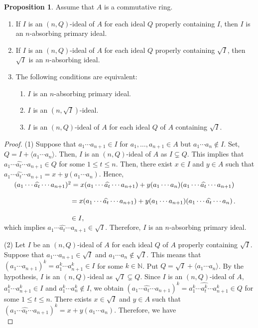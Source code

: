 \documentclass[preprint,review,10pt]{amsart}
\theoremstyle{definition}
\newtheorem{proposition}[theorem]{Proposition}
\theoremstyle{remark}
\numberwithin{equation}{section}
\begin{document}
\begin{proposition} \label{2.1}
Assume that  $A$ is a commutative ring. 
\begin{enumerate}
\item If $I$ is an  $(n,Q)$-ideal   of $A$ for each ideal $Q$   properly containing $I$, then $I$ is an $n$-absorbing primary ideal.
\item  If $I$ is an $(n,Q)$-ideal of $A$ for each ideal $Q$   properly containing $\sqrt{I}$, then $\sqrt{I}$ is an $n$-absorbing  ideal.
\item The following conditions are equivalent:
\begin{enumerate}
\item[(i)] $I$ is an  $n$-absorbing primary ideal.
\item[(ii)] $I$ is an $(n,\sqrt{I})$-ideal.
\item[(iii)] $I$ is an $(n,Q)$-ideal of $A$ for each ideal $Q$ of $A$ containing $\sqrt{I}$.
\end{enumerate}
\end{enumerate}
\begin{proof}
(1) Suppose that $a_1\cdots a_{n+1} \in I$ for $a_1,\ldots, a_{n+1} \in A$ but $a_1 \cdots a_n \notin I$. Set, $Q=I+\langle a_1 \cdots a_n \rangle $. Then, $I$ is an $(n,Q)$-ideal of $A$ as $I \subsetneq Q$. This implies that $a_1 \cdots \widehat{a_t} \cdots a_{n+	1} \in Q$ for some $1 \leq t \leq n$. Then, there exist $x \in I$ and $y \in A$ such that $a_1 \cdots \widehat{a_t} \cdots a_{n+	1}=x+y(a_1 \cdots a_n)$. Hence, \\

$\hspace{0.5cm}(a_1 \cdots \widehat{a_t} \cdots a_{n+	1})^2=x(a_1 \cdots \widehat{a_t} \cdots a_{n+	1})+y(a_1 \cdots a_n)(a_1 \cdots \widehat{a_t} \cdots a_{n+	1})$

$\hspace{3.4cm}=x(a_1 \cdots \widehat{a_t} \cdots a_{n+	1})+y(a_1 \cdots a_{n+1})(a_1 \cdots \widehat{a_t} \cdots a_n)$.

$\hspace{3.4cm} \in I,$\\

which implies $ a_1 \cdots \widehat{a_t} \cdots a_{n+	1} \in \sqrt{I}$. Therefore, $I$ is an $n$-absorbing primary ideal.

(2) Let $I$ be  an $(n,Q)$-ideal of $A$ for each ideal $Q$ of $A$ properly containing $\sqrt{I}$. Suppose  that $a_1 \cdots a_{n+1} \in \sqrt{I}$ and $a_1 \cdots a_n \notin \sqrt{I}$. This means  that $(a_1 \cdots a_{n+1})^k=a_1^k \cdots a_{n+1}^k\in I$ for some $k \in \mathbb{N}$. Put $Q=\sqrt{I}+\langle a_1 \cdots a_n \rangle$. By the hypothesis, $I$ is an $(n,Q)$-ideal as $\sqrt{I} \subsetneq Q$. Since $I$ is  an $(n,Q)$-ideal of $A$, $a_1^k \cdots a_{n+1}^k\in I$ and $a_1^k \cdots a_n^k\notin I$, we obtain $(a_1 \cdots \widehat{a_t} \cdots a_{n+1})^k=a_1^k \cdots \widehat{a_t^k} \cdots a_{n+1}^k\in Q$ for some $1 \leq t \leq n$. There exists $x \in \sqrt{I}$ and $y \in A$ such that $(a_1 \cdots \widehat{a_t} \cdots a_{n+1})^k=x+y(a_1 \cdots a_n)$. Therefore, we have\\



\end{proof}
\end{proposition}
\end{document}

